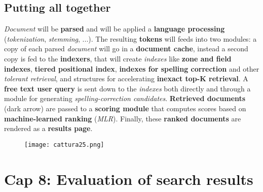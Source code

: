 \documentclass{article}
\begin{document}
\subsection{Putting all together}
\emph{Document} will be \textbf{parsed} and will be applied a \textbf{language processing} (\emph{tokenization}, \emph{stemming}, ...). The resulting \textbf{tokens} will feeds into two modules: a copy of each parsed \emph{document} will go in a \textbf{document cache}, instead a second copy is fed to the \textbf{indexers}, that will create \emph{indexes} like \textbf{zone and field indexes}, \textbf{tiered positional index}, \textbf{indexes for spelling correction} and other \emph{tolerant retrieval}, and structures for accelerating \textbf{inexact top-K retrieval}. A \textbf{free text user query} is sent down to the \emph{indexes} both directly and through a module for generating \emph{spelling-correction candidates}. \textbf{Retrieved documents} (dark arrow) are passed to a \textbf{scoring module} that computes scores based on \textbf{machine-learned ranking} (\emph{MLR}). Finally, these \textbf{ranked documents} are rendered as a \textbf{results page}.
\begin{figure}[H]
  \centering
  \texttt{[image: cattura25.png]}
\end{figure}
\section{Cap 8: Evaluation of search results}
\end{document}
